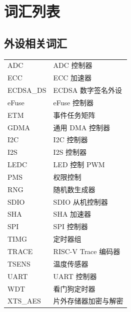 \section*{词汇列表}\label{glossary}
\rhead{\Navigation}

\subsection*{外设相关词汇}

\begin{longtable}[c]{p{3cm}p{12cm} }

ADC & ADC 控制器 \\
ECC & ECC 加速器 \\
ECDSA\_DS & ECDSA 数字签名外设 \\
eFuse & eFuse 控制器 \\
ETM & 事件任务矩阵 \\
GDMA & 通用 DMA 控制器 \\
I2C & I2C 控制器 \\
I2S & I2S 控制器 \\
LEDC & LED 控制 PWM \\
PMS & 权限控制 \\
RNG & 随机数生成器 \\
SDIO & SDIO 从机控制器 \\
SHA & SHA 加速器 \\
SPI & SPI 控制器 \\
TIMG & 定时器组 \\
TRACE & RISC-V Trace 编码器 \\
TSENS & 温度传感器 \\
UART & UART 控制器 \\
WDT & 看门狗定时器 \\
XTS\_AES & 片外存储器加密与解密 \\

\end{longtable}








